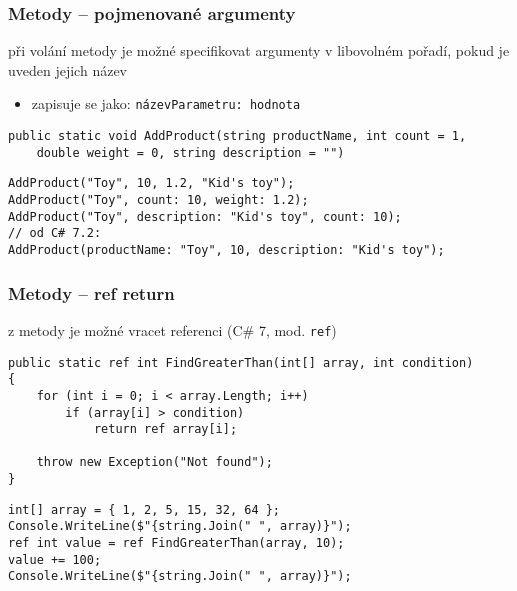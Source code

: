 \begin{frame}[fragile]
\frametitle{Metody -- pojmenované argumenty}
\begin{bitemize}{}
\item při volání metody je možné specifikovat argumenty v libovolném pořadí, pokud je uveden jejich název
\begin{itemize}
\item zapisuje se jako: \lstinline|názevParametru: hodnota|
\end{itemize}

\end{bitemize}
\vfill
\begin{yesblock}
\begin{lstlisting}[basicstyle=\small]
public static void AddProduct(string productName, int count = 1, 
    double weight = 0, string description = "")
\end{lstlisting}
\end{yesblock}
\vfill
\begin{yesblock}
\begin{lstlisting}[basicstyle=\small]
AddProduct("Toy", 10, 1.2, "Kid's toy");
AddProduct("Toy", count: 10, weight: 1.2);
AddProduct("Toy", description: "Kid's toy", count: 10);
// od C# 7.2:
AddProduct(productName: "Toy", 10, description: "Kid's toy"); 
\end{lstlisting}
\end{yesblock}
\end{frame}




\begin{frame}[fragile]
\frametitle{Metody -- ref return}

\begin{bitemize}{}
\item z metody je možné vracet referenci (C\# 7, mod. \lstinline|ref|)
\end{bitemize}
\vfill
\begin{yesblock}
\begin{lstlisting}[basicstyle=\small]
public static ref int FindGreaterThan(int[] array, int condition)
{
    for (int i = 0; i < array.Length; i++)
        if (array[i] > condition)
            return ref array[i];

    throw new Exception("Not found");
}
\end{lstlisting}
\end{yesblock}
\vfill
\begin{yesblock}
\begin{lstlisting}[basicstyle=\small]
int[] array = { 1, 2, 5, 15, 32, 64 };
Console.WriteLine($"{string.Join(" ", array)}");
ref int value = ref FindGreaterThan(array, 10);
value += 100;
Console.WriteLine($"{string.Join(" ", array)}");
\end{lstlisting}
\end{yesblock}
\end{frame}





